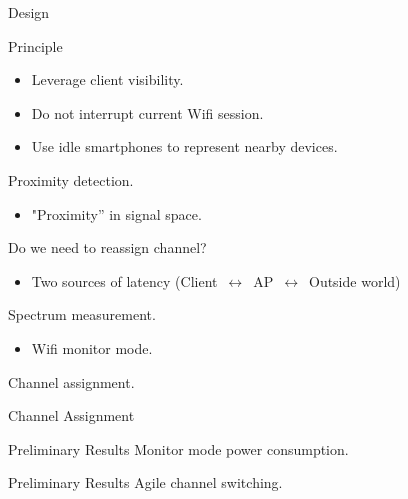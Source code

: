 \begin{frame}{\PS{} Design}
  \begin{block}{Principle}
    \begin{itemize}
      \item Leverage client visibility.
      \item Do not interrupt current Wifi session.
      \item Use idle smartphones to represent nearby devices.
    \end{itemize}
  \end{block}
   Proximity detection.
   \begin{itemize}
     \item "Proximity'' in signal space.
   \end{itemize}
   Do we need to reassign channel?
   \begin{itemize}
     \item Two sources of latency
       (Client~$\longleftrightarrow$~AP~$\longleftrightarrow$~Outside world)
   \end{itemize}
   Spectrum measurement.
   \begin{itemize}
     \item Wifi monitor mode.
   \end{itemize}
   Channel assignment.
\end{frame}

\begin{frame}{Channel Assignment}
  \begin{figure}
    \begin{subfigure}{0.5\textwidth}
    \end{subfigure}
    \begin{subfigure}{0.5\textwidth}
    \end{subfigure}
    \begin{subfigure}{0.5\textwidth}
    \end{subfigure}
    \begin{subfigure}{0.5\textwidth}
    \end{subfigure}
  \end{figure}
\end{frame}

\begin{frame}{Preliminary Results}
  Monitor mode power consumption.
\end{frame}

\begin{frame}{Preliminary Results}
  Agile channel switching.
\end{frame}
